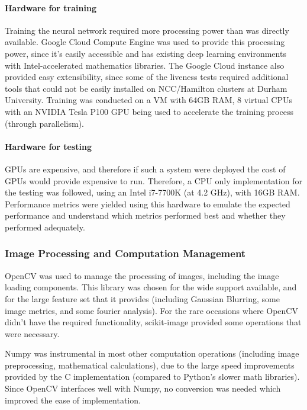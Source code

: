 \documentclass[10pt,a4paper]{article}
\begin{document}
            \paragraph{Hardware for training}
            Training the neural network required more processing power than was directly available. Google Cloud Compute Engine was used to provide this processing power, since it's easily accessible and has existing
            deep learning environments with Intel-accelerated mathematics libraries. The Google Cloud instance also provided easy extensibility, since some of the liveness tests required additional tools that could not be easily installed
            on NCC/Hamilton clusters at Durham University. Training was conducted on a VM with 64GB RAM, 8 virtual CPUs with an NVIDIA Tesla P100 GPU being used to accelerate the training process (through parallelism).

            \paragraph{Hardware for testing}
            GPUs are expensive, and therefore if such a system were deployed the cost of GPUs would provide expensive to run. Therefore, a CPU only implementation for the testing was followed, using an Intel i7-7700K (at 4.2 GHz), with
            16GB RAM. Performance metrics were yielded using this hardware to emulate the expected performance and understand which metrics performed best and whether they performed adequately.

        \subsubsection{Image Processing and Computation Management}
            OpenCV was used to manage the processing of images, including the image loading components. This library was chosen for the wide support available, and for the large feature set that it provides (including Gaussian Blurring, some image metrics, and some fourier analysis).
            For the rare occasions where OpenCV didn't have the required functionality, scikit-image provided some operations that were necessary.
            
            Numpy was instrumental in most other computation operations (including image preprocessing, mathematical calculations), due to the large speed improvements provided by the C implementation (compared to Python's slower math libraries).
            Since OpenCV interfaces well with Numpy, no conversion was needed which improved the ease of implementation.
\end{document}
